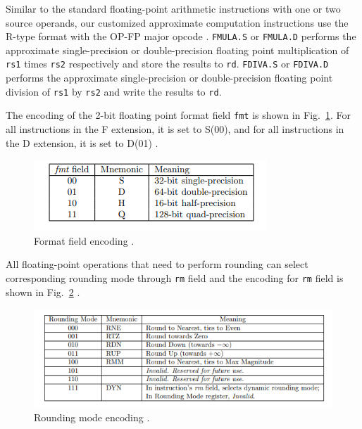 Similar to the standard floating-point arithmetic instructions with one or two source operands, our customized approximate computation instructions use the R-type format with the OP-FP major opcode \cite{RISC-V_unprivileged_ISA}. \texttt{FMULA.S} or \texttt{FMULA.D} performs the approximate single-precision or double-precision floating point multiplication of \texttt{rs1} times \texttt{rs2} respectively and store the results to \texttt{rd}. \texttt{FDIVA.S} or \texttt{FDIVA.D} performs the approximate single-precision or double-precision floating point division of \texttt{rs1} by \texttt{rs2} and write the results to \texttt{rd}.

The encoding of the 2-bit floating point format field \texttt{fmt} is shown in Fig.~\ref{fig:format field enconding}. For all instructions in the F extension, it is set to S(00), and for all instructions in the D extension, it is set to D(01) \cite{RISC-V_unprivileged_ISA}.

\begin{figure}[!htp]
    \centering
    \includegraphics[width=0.5\linewidth]{figure/fmt.png}
    \caption{Format field encoding \cite{RISC-V_unprivileged_ISA}.}
    \label{fig:format field enconding}
\end{figure}

All floating-point operations that need to perform rounding can select corresponding rounding mode through \texttt{rm} field and the encoding for \texttt{rm} field is shown in Fig.~\ref{fig:rounding mode encoding} \cite{RISC-V_unprivileged_ISA}.
\begin{figure}[!htp]
    \centering
    \includegraphics[width=0.8\linewidth]{figure/rounding mode encoding.png}
    \caption{Rounding mode encoding \cite{RISC-V_unprivileged_ISA}.}
    \label{fig:rounding mode encoding}
\end{figure}

